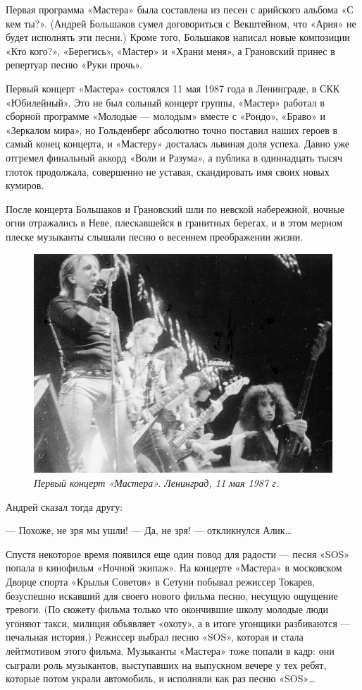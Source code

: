 \documentclass[16pt,a5paper,oneside]{book}
\begin{document}
Первая программа «Мастера» была составлена из песен с арийского альбома «С кем ты?». (Андрей Большаков сумел
договориться с Векштейном, что «Ария» не будет исполнять эти песни.) Кроме того, Большаков написал новые композиции
«Кто кого?», «Берегись», «Мастер» и «Храни меня», а Грановский принес в репертуар песню «Руки прочь».

Первый концерт «Мастера» состоялся 11 мая 1987 года в Ленинграде, в СКК «Юбилейный». Это не был сольный концерт группы,
«Мастер» работал в сборной программе «Молодые — молодым» вместе с «Рондо», «Браво» и «Зеркалом мира», но Гольденберг
абсолютно точно поставил наших героев в самый конец концерта, и «Мастеру» досталась львиная доля успеха. Давно уже
отгремел финальный аккорд «Воли и Разума», а публика в одиннадцать тысяч глоток продолжала, совершенно не уставая,
скандировать имя своих новых кумиров.

После концерта Большаков и Грановский шли по невской набережной, ночные огни отражались в Неве, плескавшейся в гранитных
берегах, и в этом мерном плеске музыканты слышали песню о весеннем преображении жизни.

\begin{figure}
    \centering
    \includegraphics[scale=0.8]{Image18}
    \caption{\textit{Первый концерт «Мастера». Ленинград, 11 мая 1987 г.}}
\end{figure}

Андрей сказал тогда другу:

— Похоже, не зря мы ушли!
— Да, не зря! — откликнулся Алик\ldots

Спустя некоторое время появился еще один повод для радости — песня «SOS» попала в кинофильм «Ночной экипаж». На концерте
«Мастера» в московском Дворце спорта «Крылья Советов» в Сетуни побывал режиссер Токарев, безуспешно искавший для своего
нового фильма песню, несущую ощущение тревоги. (По сюжету фильма только что окончившие школу молодые люди угоняют такси,
милиция объявляет «охоту», а в итоге угонщики разбиваются — печальная история.) Режиссер выбрал песню «SOS», которая и
стала лейтмотивом этого фильма. Музыканты «Мастера» тоже попали в кадр: они сыграли роль музыкантов, выступавших на
выпускном вечере у тех ребят, которые потом украли автомобиль, и исполняли как раз песню «SOS»\ldots
\end{document}
